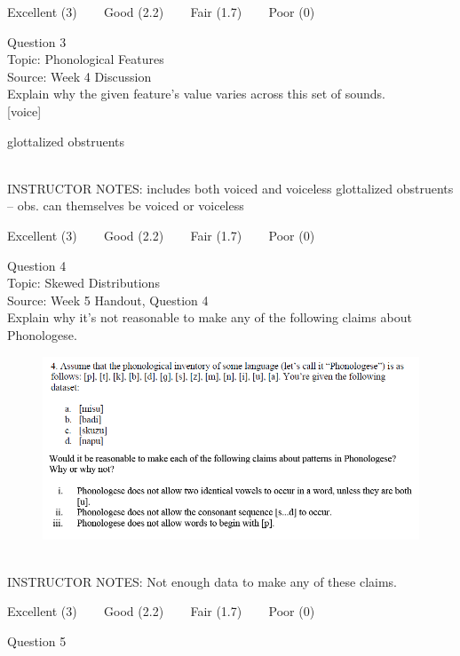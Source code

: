\documentclass[12pt]{article}
\begin{document}
\vfill
Excellent (3) ~~~ Good (2.2) ~~~ Fair (1.7) ~~~ Poor (0)
\newpage

{\large Question 3}\\

Topic: Phonological Features\\
Source: Week 4 Discussion\\

Explain why the given feature's value varies across this set of sounds.\\

{[voice]}

glottalized obstruents


~\\
INSTRUCTOR NOTES: includes both voiced and voiceless glottalized obstruents -- obs. can themselves be voiced or voiceless


\vfill
Excellent (3) ~~~ Good (2.2) ~~~ Fair (1.7) ~~~ Poor (0)
\newpage

{\large Question 4}\\

Topic: Skewed Distributions\\
Source: Week 5 Handout, Question 4\\

Explain why it's not reasonable to make any of the following claims about Phonologese.\\

\begin{figure}[H]
\includegraphics{../images/Phonologese.png}
\end{figure}

~\\
INSTRUCTOR NOTES: Not enough data to make any of these claims.


\vfill
Excellent (3) ~~~ Good (2.2) ~~~ Fair (1.7) ~~~ Poor (0)
\newpage

{\large Question 5}\\
\end{document}
